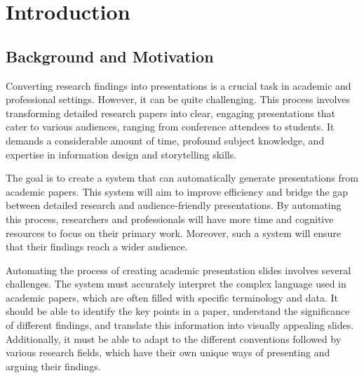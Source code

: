 
\chapter{Introduction}
\label{ch:intro}


\section{Background and Motivation}
\label{sec:intro:background}


Converting research findings into presentations is a crucial task in academic and professional settings. However, it can be quite challenging. This process involves transforming detailed research papers into clear, engaging presentations that cater to various audiences, ranging from conference attendees to students. It demands a considerable amount of time, profound subject knowledge, and expertise in information design and storytelling skills.

The goal is to create a system that can automatically generate presentations from academic papers. This system will aim to improve efficiency and bridge the gap between detailed research and audience-friendly presentations. By automating this process, researchers and professionals will have more time and cognitive resources to focus on their primary work. Moreover, such a system will ensure that their findings reach a wider audience.

Automating the process of creating academic presentation slides involves several challenges. The system must accurately interpret the complex language used in academic papers, which are often filled with specific terminology and data. It should be able to identify the key points in a paper, understand the significance of different findings, and translate this information into visually appealing slides. Additionally, it must be able to adapt to the different conventions followed by various research fields, which have their own unique ways of presenting and arguing their findings.

